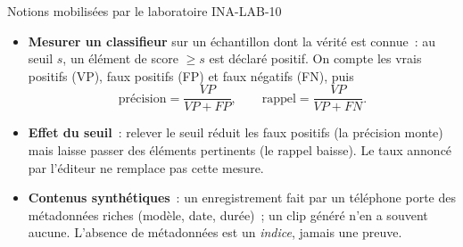 \begin{boiteRemarque}{Notions mobilisées par le laboratoire INA-LAB-10}
\begin{itemize}
    \item \textbf{Mesurer un classifieur} sur un échantillon dont la vérité
          est connue~: au seuil $s$, un élément de score $\geq s$ est
          déclaré positif. On compte les vrais positifs (VP), faux positifs
          (FP) et faux négatifs (FN), puis
          \[
          \text{précision} = \frac{VP}{VP+FP}, \qquad
          \text{rappel} = \frac{VP}{VP+FN}.
          \]
    \item \textbf{Effet du seuil}~: relever le seuil réduit les faux
          positifs (la précision monte) mais laisse passer des éléments
          pertinents (le rappel baisse). Le taux annoncé par l'éditeur ne
          remplace pas cette mesure.
    \item \textbf{Contenus synthétiques}~: un enregistrement fait par un
          téléphone porte des métadonnées riches (modèle, date, durée)~; un
          clip généré n'en a souvent aucune. L'absence de métadonnées est un
          \emph{indice}, jamais une preuve.
\end{itemize}
\end{boiteRemarque}

